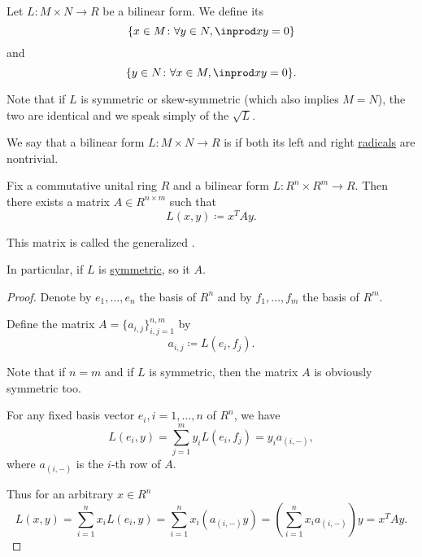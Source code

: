 \begin{definition}\label{def:bilinear_form_radicals}\mcite\cite[250]{Knapp2016BAlg}
  Let \( L: M \times N \to R \) be a bilinear form. We define its 
  \begin{equation*}
    \{ x \in M \colon \forall y \in N, \inprod x y = 0 \}
  \end{equation*}
  and 
  \begin{equation*}
    \{ y \in N \colon \forall x \in M, \inprod x y = 0 \}.
  \end{equation*}

  Note that if \( L \) is symmetric or skew-symmetric (which also implies \( M = N \)), the two are identical and we speak simply of the  \( \sqrt L \).
\end{definition}

\begin{definition}\label{def:nondegenerate_bilinear_form}\mcite\cite[249]{Knapp2016BAlg}
  We say that a bilinear form \( L: M \times N \to R \) is  if both its left and right \hyperref[def:bilinear_form_radicals]{radicals} are nontrivial.
\end{definition}

\begin{theorem}\label{thm:bilinear_form_matrix_presentation}
  Fix a commutative unital ring \( R \) and a bilinear form \( L: R^n \times R^m \to R \). Then there exists a matrix \( A \in R^{n \times m} \) such that
  \begin{equation*}
    L(x, y) \coloneqq x^T A y.
  \end{equation*}

  This matrix is called the generalized .

  In particular, if \( L \) is \hyperref[def:symmetric_function]{symmetric}, so it \( A \).
\end{theorem}
\begin{proof}
  Denote by \( e_1, \ldots, e_n \) the basis of \( R^n \) and by \( f_1, \ldots, f_m \) the basis of \( R^m \).

  Define the matrix \( A = \{ a_{i,j} \}_{i,j=1}^{n,m} \) by
  \begin{equation*}
    a_{i,j} \coloneqq L(e_i, f_j).
  \end{equation*}

  Note that if \( n = m \) and if \( L \) is symmetric, then the matrix \( A \) is obviously symmetric too.

  For any fixed basis vector \( e_i, i = 1, \ldots, n \) of \( R^n \), we have
  \begin{equation*}
    L(e_i, y)
    =
    \sum_{j=1}^m y_i L(e_i, f_j)
    =
    y_i a_{(i,-)},
  \end{equation*}
  where \( a_{(i,-)} \) is the \( i \)-th row of \( A \).

  Thus for an arbitrary \( x \in R^n \)
  \begin{equation*}
    L(x, y)
    =
    \sum_{i=1}^n x_i L(e_i, y)
    =
    \sum_{i=1}^n x_i (a_{(i,-)} y)
    =
    \left( \sum_{i=1}^n x_i a_{(i,-)} \right) y
    =
    x^T A y.
  \end{equation*}
\end{proof}

